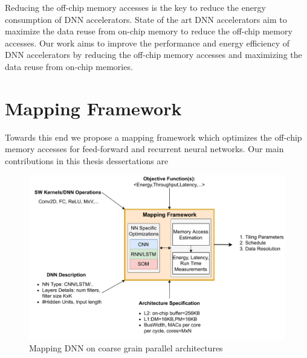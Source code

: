 \documentclass[a4paper,10pt]{article}
\begin{document}
Reducing the off-chip memory accesses is the key to reduce the energy consumption of DNN accelerators. State of the art DNN accelerators aim to maximize the data reuse from on-chip memory to reduce the off-chip memory accesses. Our work aims to improve the performance and energy efficiency of DNN accelerators by reducing the off-chip memory accesses and maximizing the data reuse from on-chip memories.
\section{Mapping Framework}
Towards this end we propose a mapping framework which optimizes the off-chip memory accesses for feed-forward and recurrent neural networks. Our main contributions in this thesis dessertations are
\begin{figure}[ht]
	\centering
	\includegraphics[width=0.7\linewidth]{./images/blockDiagram}
	\caption{Mapping DNN on coarse grain parallel architectures}
	\label{fig:introduction}
\end{figure}
\end{document}
